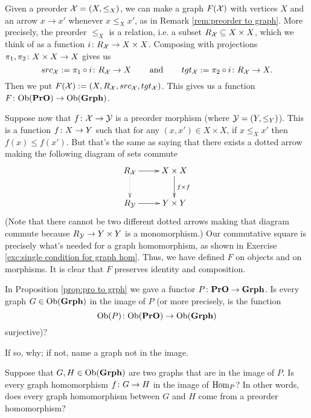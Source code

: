\documentclass[CT4S-EN-RU]{subfiles}
\begin{document}
\begin{propositionRUS}\label{prop:pro to grph}
\end{propositionRUS}

\begin{proofENG}
Given a preorder $\mathcal{X}=(X,\leq_X)$, we can make a graph $F(\mathcal{X})$ with vertices $X$ and an arrow $x\to x'$ whenever $x\leq_X x'$, as in Remark \ref{rem:preorder to graph}. More precisely, the preorder $\leq_X$ is a relation, i.e. a subset $R_\mathcal{X}\subseteq X\times X$, which we think of as a function $i\colon R_\mathcal{X}\rightarrow X\times X$. Composing with projections $\pi_1,\pi_2\colon X\times X\rightarrow X$ gives us $$src_\mathcal{X}:=\pi_1\circ i\colon R_\mathcal{X}\rightarrow X\hspace{.3in}\textnormal{and}\hspace{.3in} tgt_\mathcal{X}:=\pi_2\circ i\colon R_\mathcal{X}\rightarrow X.$$ Then we put $F(\mathcal{X}):=(X,R_\mathcal{X},src_\mathcal{X},tgt_\mathcal{X})$. This gives us a function $F\colon\textnormal{Ob}({\bf PrO})\rightarrow\textnormal{Ob}({\bf Grph})$.

Suppose now that $f\colon\mathcal{X}\rightarrow\mathcal{Y}$ is a preorder morphism (where $\mathcal{Y}=(Y,\leq_Y)$). This is a function $f\colon X\rightarrow Y$ such that for any $(x,x')\in X\times X$, if $x\leq_X x'$ then $f(x)\leq f(x')$. But that's the same as saying that there exists a dotted arrow making the following diagram of sets commute
$$
\xymatrix{R_\mcX\ar[r]\ar@{..>}[d]&X\times X\ar[d]^{f\times f}\\R_\mcY\ar[r]&Y\times Y
}
$$
(Note that there cannot be two different dotted arrows making that diagram commute because $R_\mathcal{Y}\rightarrow Y\times Y$ is a monomorphism.) 
Our commutative square is precisely what's needed for a graph homomorphism, as shown in Exercise \ref{exc:single condition for graph hom}. Thus, we have defined $F$ on objects and on morphisms. It is clear that $F$ preserves identity and composition.
\end{proofENG}

\begin{proofRUS}
\end{proofRUS}

\begin{exerciseENG}
In Proposition \ref{prop:pro to grph} we gave a functor $P\colon{\bf PrO}\rightarrow{\bf Grph}$.
\sexc  Is every graph $G\in\textnormal{Ob}({\bf Grph})$ in the image of $P$ (or more precisely, is the function $$\textnormal{Ob}(P)\colon\textnormal{Ob}({\bf PrO})\rightarrow\textnormal{Ob}({\bf Grph})$$ surjective)?
\item If so, why; if not, name a graph not in the image.
\item Suppose that $G, H\in\textnormal{Ob}({\bf Grph})$ are two graphs that are in the image of $P$. Is every graph homomorphism $f\colon G\rightarrow H$ in the image of $\textnormal{Hom}_P$? In other words, does every graph homomorphism between $G$ and $H$ come from a preorder homomorphism?
\endsexc
\end{exerciseENG}
\end{document}
